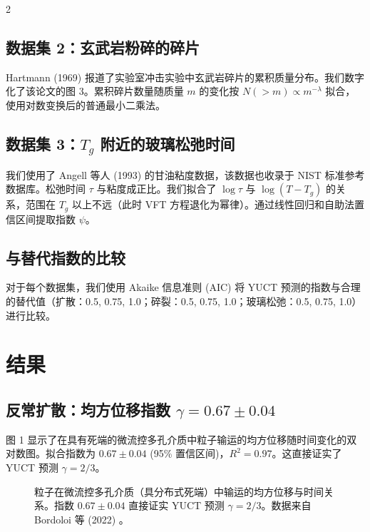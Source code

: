 \documentclass[11pt,a4paper]{article}
\begin{document}
\begin{multicols}{2}
		\subsection{数据集 2：玄武岩粉碎的碎片}
		Hartmann (1969) \cite{Hartmann1969} 报道了实验室冲击实验中玄武岩碎片的累积质量分布。我们数字化了该论文的图 3。累积碎片数量随质量 \(m\) 的变化按 \(N(>m) \propto m^{-\lambda}\) 拟合，使用对数变换后的普通最小二乘法。
		
		\subsection{数据集 3：\(T_g\) 附近的玻璃松弛时间}
		我们使用了 Angell 等人 (1993) \cite{Angell1993} 的甘油粘度数据，该数据也收录于 NIST 标准参考数据库。松弛时间 \(\tau\) 与粘度成正比。我们拟合了 \(\log \tau\) 与 \(\log(T - T_g)\) 的关系，范围在 \(T_g\) 以上不远（此时 VFT 方程退化为幂律）。通过线性回归和自助法置信区间提取指数 \(\psi\)。
		
		\subsection{与替代指数的比较}
		对于每个数据集，我们使用 Akaike 信息准则 (AIC) 将 YUCT 预测的指数与合理的替代值（扩散：0.5, 0.75, 1.0；碎裂：0.5, 0.75, 1.0；玻璃松弛：0.5, 0.75, 1.0）进行比较。
		
		\section{结果}
		
		\subsection{反常扩散：均方位移指数 \(\gamma = 0.67 \pm 0.04\)}
		
		图 1 显示了在具有死端的微流控多孔介质中粒子输运的均方位移随时间变化的双对数图。拟合指数为 \(0.67 \pm 0.04\) (95\% 置信区间)，\(R^2 = 0.97\)。这直接证实了 YUCT 预测 \(\gamma = 2/3\)。
		
		\begin{figure}[htbp]
			\centering
			\caption{粒子在微流控多孔介质（具分布式死端）中输运的均方位移与时间关系。指数 \(0.67 \pm 0.04\) 直接证实 YUCT 预测 \(\gamma = 2/3\)。数据来自 Bordoloi 等 (2022) \cite{Bordoloi2022}。}
			\label{fig:diffusion}
		\end{figure}
		

\end{multicols}
\end{document}
